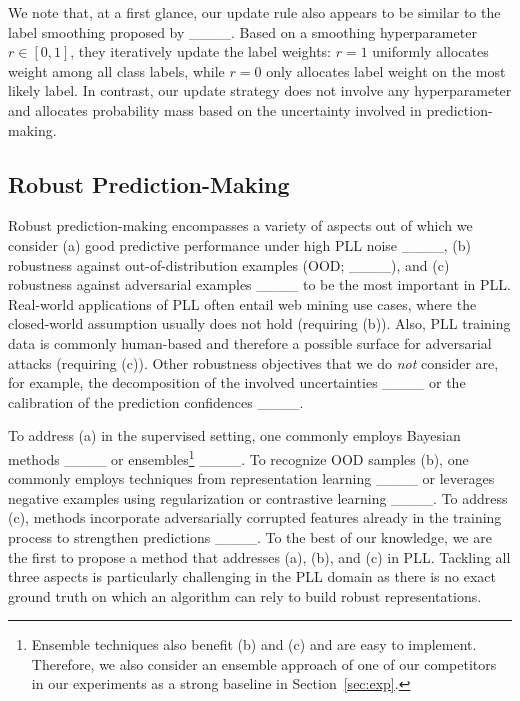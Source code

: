 We note that, at a first glance, our update rule also appears to be similar to the label smoothing proposed by ____.
Based on a smoothing hyperparameter~$r \in [0, 1]$, they iteratively update the label weights: $r = 1$ uniformly allocates weight among all class labels, while $r = 0$ only allocates label weight on the most likely label.
In contrast, our update strategy does not involve any hyperparameter and allocates probability mass based on the uncertainty involved in prediction-making.

\subsection{Robust Prediction-Making}
Robust prediction-making encompasses a variety of aspects out of which we consider (a) good predictive performance under high PLL noise ____, (b) robustness against out-of-distribution examples (OOD; ____), and (c) robustness against adversarial examples ____ to be the most important in PLL.
Real-world applications of PLL often entail web mining use cases, where the closed-world assumption usually does not hold (requiring (b)).
Also, PLL training data is commonly human-based and therefore a possible surface for adversarial attacks (requiring (c)).
Other robustness objectives that we do \emph{not} consider are, for example, the decomposition of the involved uncertainties ____ or the calibration of the prediction confidences ____.

To address (a) in the supervised setting, one commonly employs Bayesian methods ____ or ensembles\footnote{Ensemble techniques also benefit (b) and (c) and are easy to implement. Therefore, we also consider an ensemble approach of one of our competitors in our experiments as a strong baseline in Section~\ref{sec:exp}.} ____.
To recognize OOD samples (b), one commonly employs techniques from representation learning ____ or leverages negative examples using regularization or contrastive learning ____.
To address (c), methods incorporate adversarially corrupted features already in the training process to strengthen predictions ____.
To the best of our knowledge, we are the first to propose a method that addresses (a), (b), and (c) in PLL.
Tackling all three aspects is particularly challenging in the PLL domain as there is no exact ground truth on which an algorithm can rely to build robust representations.